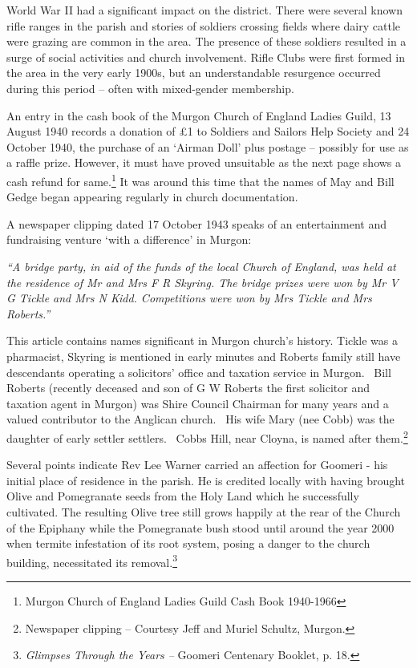World War II had a significant impact on the district. There were several known rifle ranges in the parish and stories of soldiers crossing fields where dairy cattle were grazing are common in the area. The presence of these soldiers resulted in a surge of social activities and church involvement. Rifle Clubs were first formed in the area in the very early 1900s, but an understandable resurgence occurred during this period -- often with mixed-gender membership.



An entry in the cash book of the Murgon Church of England Ladies Guild, 13 August 1940 records a donation of \pounds1 to Soldiers and Sailors Help Society and 24 October 1940, the purchase of an `Airman Doll' plus postage -- possibly for use as a raffle prize. However, it must have proved unsuitable as the next page shows a cash refund for same.\footnote{Murgon Church of England Ladies Guild Cash Book 1940-1966} It was around this time that the names of May and Bill Gedge began appearing regularly in church documentation.


A newspaper clipping dated 17 October 1943 speaks of an entertainment and fundraising venture `with a difference' in Murgon:



\emph{``A bridge party, in aid of the funds of the local Church of England, was held at the residence of Mr and Mrs F R Skyring. The bridge prizes were won by Mr V G Tickle and Mrs N Kidd. Competitions were won by Mrs Tickle and Mrs Roberts.''}



\smallskip


This article contains names significant in Murgon church's history. Tickle was a pharmacist, Skyring is mentioned in early minutes and Roberts family still have descendants operating a solicitors' office and taxation service in Murgon.~ Bill Roberts (recently deceased and son of G W Roberts the first solicitor and taxation agent in Murgon) was Shire Council Chairman for many years and a valued contributor to the Anglican church.~ His wife Mary (nee Cobb) was the daughter of early settler settlers.~ Cobbs Hill, near Cloyna, is named after them.\footnote{Newspaper clipping -- Courtesy Jeff and Muriel Schultz, Murgon.}


Several points indicate Rev Lee Warner carried an affection for Goomeri - his initial place of residence in the parish. He is credited locally with having brought Olive and Pomegranate seeds from the Holy Land which he successfully cultivated. The resulting Olive tree still grows happily at the rear of the Church of the Epiphany while the Pomegranate bush stood until around the year 2000 when termite infestation of its root system, posing a danger to the church building, necessitated its removal.\footnote{\emph{Glimpses Through the Years --} Goomeri Centenary Booklet, p. 18.}


